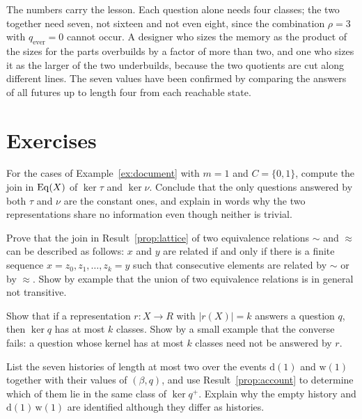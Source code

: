 The numbers carry the lesson. Each question alone needs four classes; the two together need seven, not sixteen and not even eight, since the combination $\rho=3$ with $q_{\mathrm{ever}}=0$ cannot occur. A designer who sizes the memory as the product of the sizes for the parts overbuilds by a factor of more than two, and one who sizes it as the larger of the two underbuilds, because the two quotients are cut along different lines. The seven values have been confirmed by comparing the answers of all futures up to length four from each reachable state.

\section*{Exercises}

\begin{exercise}
For the cases of Example~\ref{ex:document} with $m=1$ and $C=\{0,1\}$, compute the join in $\operatorname{Eq}(X)$ of $\ker\tau$ and $\ker\nu$. Conclude that the only questions answered by both $\tau$ and $\nu$ are the constant ones, and explain in words why the two representations share no information even though neither is trivial.
\end{exercise}

\begin{exercise}
Prove that the join in Result~\ref{prop:lattice} of two equivalence relations $\sim$ and $\approx$ can be described as follows: $x$ and $y$ are related if and only if there is a finite sequence $x=z_0,z_1,\dots,z_k=y$ such that consecutive elements are related by $\sim$ or by $\approx$. Show by example that the union of two equivalence relations is in general not transitive.\label{ex:join-chain}
\end{exercise}

\begin{exercise}
Show that if a representation $r:X\to R$ with $|r(X)|=k$ answers a question $q$, then $\ker q$ has at most $k$ classes. Show by a small example that the converse fails: a question whose kernel has at most $k$ classes need not be answered by $r$.\label{ex:k-classes}
\end{exercise}

\begin{exercise}
List the seven histories of length at most two over the events $\mathrm{d}(1)$ and $\mathrm{w}(1)$ together with their values of $(\beta,q)$, and use Result~\ref{prop:account} to determine which of them lie in the same class of $\ker q^{+}$. Explain why the empty history and $\mathrm{d}(1)\,\mathrm{w}(1)$ are identified although they differ as histories.
\end{exercise}

